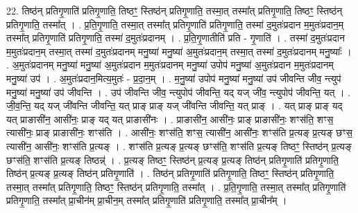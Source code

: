 \documentclass[17pt]{extarticle}
\begin{document}
22. तिष्ठ॑न् प्रतिगृ॒णाति॑ प्रतिगृ॒णाति॒ तिष्ठꣳ॒॒ स्तिष्ठ॑न् प्रतिगृ॒णाति॒ तस्मा॒त् तस्मा᳚त् प्रतिगृ॒णाति॒ तिष्ठꣳ॒॒ स्तिष्ठ॑न् प्रतिगृ॒णाति॒ तस्मा᳚त् । . प्र॒ति॒गृ॒णाति॒ तस्मा॒त् तस्मा᳚त् प्रतिगृ॒णाति॑ प्रतिगृ॒णाति॒ तस्मा॑ द॒मुतः॑प्रदान म॒मुतः॑प्रदान॒म् तस्मा᳚त् प्रतिगृ॒णाति॑ प्रतिगृ॒णाति॒ तस्मा॑ द॒मुतः॑प्रदानम् । . प्र॒ति॒गृ॒णातीति॑ प्रति - गृ॒णाति॑ । . तस्मा॑ द॒मुतः॑प्रदान म॒मुतः॑प्रदान॒म् तस्मा॒त् तस्मा॑ द॒मुतः॑प्रदानम् मनु॒ष्या॑ मनु॒ष्या॑ 
अ॒मुतः॑प्रदान॒म् तस्मा॒त् तस्मा॑ द॒मुतः॑प्रदानम् मनु॒ष्याः᳚ । . अ॒मुतः॑प्रदानम् मनु॒ष्या॑ मनु॒ष्या॑ अ॒मुतः॑प्रदान म॒मुतः॑प्रदानम् मनु॒ष्या॑ उपोप॑ 
मनु॒ष्या॑ अ॒मुतः॑प्रदान म॒मुतः॑प्रदानम् मनु॒ष्या॑ उप॑ । . अ॒मुतः॑प्रदान॒मित्य॒मुतः॑ - प्र॒दा॒न॒म् । . म॒नु॒ष्या॑ उपोप॑ मनु॒ष्या॑ मनु॒ष्या॑ उप॑ जीवन्ति जीव॒ न्त्युप॑ मनु॒ष्या॑ मनु॒ष्या॑ उप॑ जीवन्ति । . उप॑ जीवन्ति जीव॒ न्त्युपोप॑ जीवन्ति॒ यद् यज् जी॑व॒ न्त्युपोप॑ जीवन्ति॒ यत् । . जी॒व॒न्ति॒ यद् यज् जी॑वन्ति जीवन्ति॒ यत् प्राङ् प्राङ् यज् जी॑वन्ति जीवन्ति॒ यत् प्राङ् । . यत् प्राङ् प्राङ् यद् यत् प्राङासी॑न॒ आसी॑नः॒ प्राङ् यद् यत् प्राङासी॑नः । . प्राङासी॑न॒ आसी॑नः॒ प्राङ् प्राङासी॑नः॒ शꣳस॑ति॒ शꣳस॒ त्यासी॑नः॒ प्राङ् प्राङासी॑नः॒ शꣳस॑ति । . आसी॑नः॒ शꣳस॑ति॒ शꣳस॒ त्यासी॑न॒ आसी॑नः॒ शꣳस॑ति प्र॒त्यङ् प्र॒त्यङ् छꣳस॒ त्यासी॑न॒ आसी॑नः॒ शꣳस॑ति प्र॒त्यङ् । . शꣳस॑ति प्र॒त्यङ् प्र॒त्यङ् छꣳस॑ति॒ शꣳस॑ति प्र॒त्यङ् तिष्ठꣳ॒॒ स्तिष्ठ॑न् प्र॒त्यङ् छꣳस॑ति॒ शꣳस॑ति प्र॒त्यङ् तिष्ठन्न्॑ । . प्र॒त्यङ् तिष्ठꣳ॒॒ स्तिष्ठ॑न् प्र॒त्यङ् प्र॒त्यङ् तिष्ठ॑न् प्रतिगृ॒णाति॑ प्रतिगृ॒णाति॒ तिष्ठ॑न् प्र॒त्यङ् प्र॒त्यङ् तिष्ठ॑न् प्रतिगृ॒णाति॑ । . तिष्ठ॑न् प्रतिगृ॒णाति॑ प्रतिगृ॒णाति॒ तिष्ठꣳ॒॒ स्तिष्ठ॑न् प्रतिगृ॒णाति॒ तस्मा॒त् तस्मा᳚त् प्रतिगृ॒णाति॒ तिष्ठꣳ॒॒ स्तिष्ठ॑न् प्रतिगृ॒णाति॒ तस्मा᳚त् । . प्र॒ति॒गृ॒णाति॒ तस्मा॒त् तस्मा᳚त् प्रतिगृ॒णाति॑ प्रतिगृ॒णाति॒ तस्मा᳚त् प्रा॒चीन॑म् प्रा॒चीन॒म् तस्मा᳚त् प्रतिगृ॒णाति॑ प्रतिगृ॒णाति॒ तस्मा᳚त् प्रा॒चीन᳚म् । \newline
\end{document}
